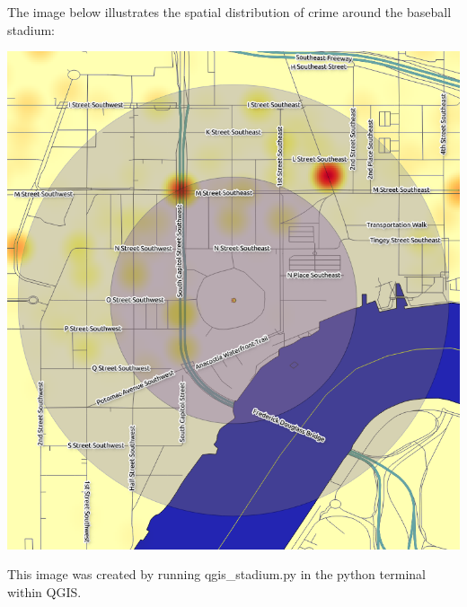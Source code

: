 \documentclass{article}
\begin{document}
\newpage

The image below illustrates the spatial distribution of crime around the baseball stadium:

\includegraphics[scale = .45]{Stadium_Heatmap} 

This image was created by running qgis\_stadium.py in the python terminal within QGIS.
\end{document}
